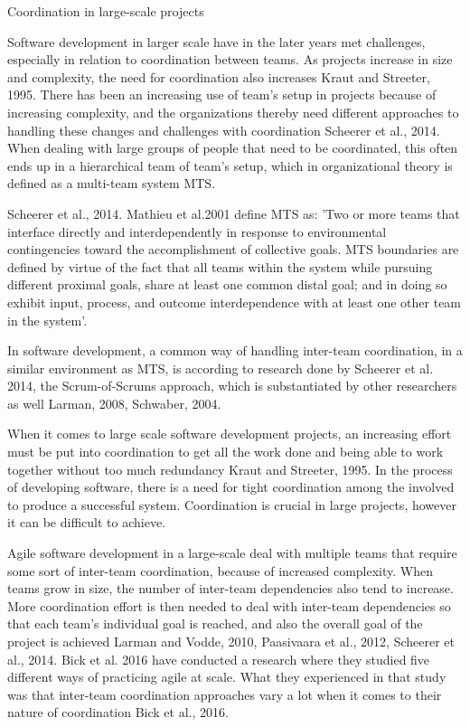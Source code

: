 Coordination in large-scale projects

Software development in larger scale have in the later years met challenges, especially in relation to coordination between teams. As projects increase in size and complexity, the need for coordination also increases Kraut and Streeter, 1995. There has been an increasing use of team’s setup in projects because of increasing complexity, and the organizations thereby need different approaches to handling these changes and challenges with coordination Scheerer et al., 2014. When dealing with large groups of people that need to be coordinated, this often ends up in a hierarchical team of team’s setup, which in organizational theory is defined as a multi-team system MTS.

Scheerer et al., 2014. Mathieu et al.2001 define MTS as:
’Two or more teams that interface directly and interdependently in response to environmental contingencies toward the accomplishment of collective goals. MTS boundaries are defined by virtue of the fact that all teams within the system while pursuing different proximal goals, share at least one common distal goal; and in doing so exhibit input, process, and outcome interdependence with at least one other team in the system’.

In software development, a common way of handling inter-team coordination, in a similar environment as MTS, is according to research done by Scheerer et al. 2014, the Scrum-of-Scrums approach, which is substantiated by other researchers as well Larman, 2008, Schwaber, 2004.

When it comes to large scale software development projects, an increasing effort must be put into coordination to get all the work done and being able to work together without too much redundancy Kraut and Streeter, 1995. In the process of developing software, there is a need for tight coordination among the involved to produce a successful system. Coordination is crucial in large projects, however it can be difficult to achieve.

Agile software development in a large-scale deal with multiple teams that require some sort of inter-team coordination, because of increased complexity. When teams grow in size, the number of inter-team dependencies also tend to increase. More coordination effort is then needed to deal with inter-team dependencies so that each team’s individual goal is reached, and also the overall goal of the project is achieved Larman and Vodde, 2010, Paasivaara et al., 2012, Scheerer et al., 2014. Bick et al. 2016 have conducted a research where they studied five different ways of practicing agile at scale. What they experienced in that study was that inter-team coordination approaches vary a lot when it comes to their nature of coordination Bick et al., 2016.



